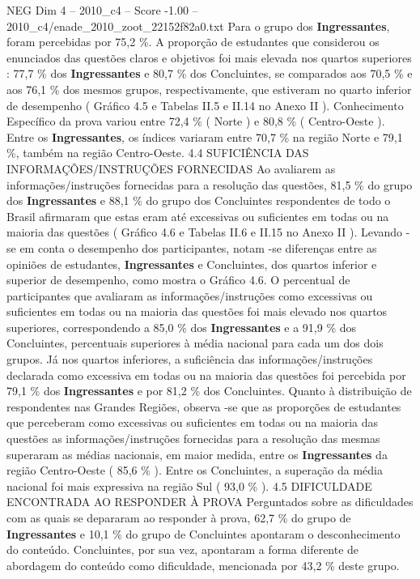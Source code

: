 \begin{textsample}{NEG Dim 4 – 2010\_c4 – Score -1.00 – 2010\_c4/enade\_2010\_zoot\_22152f82a0.txt}
Para o grupo dos \textbf{Ingressantes}, foram percebidas por 75,2 \%.
A proporção de estudantes que considerou os enunciados das questões claros e objetivos foi mais elevada nos quartos superiores : 77,7 \% dos \textbf{Ingressantes} e 80,7 \% dos Concluintes, se comparados aos 70,5 \% e aos 76,1 \% dos mesmos grupos, respectivamente, que estiveram no quarto inferior de desempenho ( Gráfico 4.5 e Tabelas II.5 e II.14 no Anexo II ).
Conhecimento Específico da prova variou entre 72,4 \% ( Norte ) e 80,8 \% ( Centro-Oeste ).
Entre os \textbf{Ingressantes}, os índices variaram entre 70,7 \% na região Norte e 79,1 \%, também na região Centro-Oeste. 4.4 SUFICIÊNCIA DAS INFORMAÇÕES/INSTRUÇÕES FORNECIDAS Ao avaliarem as informações/instruções fornecidas para a resolução das questões, 81,5 \% do grupo dos \textbf{Ingressantes} e 88,1 \% do grupo dos Concluintes respondentes de todo o Brasil afirmaram que estas eram até excessivas ou suficientes em todas ou na maioria das questões ( Gráfico 4.6 e Tabelas II.6 e II.15 no Anexo II ).
Levando -se em conta o desempenho dos participantes, notam -se diferenças entre as opiniões de estudantes, \textbf{Ingressantes} e Concluintes, dos quartos inferior e superior de desempenho, como mostra o Gráfico 4.6.
O percentual de participantes que avaliaram as informações/instruções como excessivas ou suficientes em todas ou na maioria das questões foi mais elevado nos quartos superiores, correspondendo a 85,0 \% dos \textbf{Ingressantes} e a 91,9 \% dos Concluintes, percentuais superiores à média nacional para cada um dos dois grupos.
Já nos quartos inferiores, a suficiência das informações/instruções declarada como excessiva em todas ou na maioria das questões foi percebida por 79,1 \% dos \textbf{Ingressantes} e por 81,2 \% dos Concluintes.
Quanto à distribuição de respondentes nas Grandes Regiões, observa -se que as proporções de estudantes que perceberam como excessivas ou suficientes em todas ou na maioria das questões as informações/instruções fornecidas para a resolução das mesmas superaram as médias nacionais, em maior medida, entre os \textbf{Ingressantes} da região Centro-Oeste ( 85,6 \% ).
Entre os Concluintes, a superação da média nacional foi mais expressiva na região Sul ( 93,0 \% ). 4.5 DIFICULDADE ENCONTRADA AO RESPONDER À PROVA Perguntados sobre as dificuldades com as quais se depararam ao responder à prova, 62,7 \% do grupo de \textbf{Ingressantes} e 10,1 \% do grupo de Concluintes apontaram o desconhecimento do conteúdo.
Concluintes, por sua vez, apontaram a forma diferente de abordagem do conteúdo como dificuldade, mencionada por 43,2 \% deste grupo.

\end{textsample}
